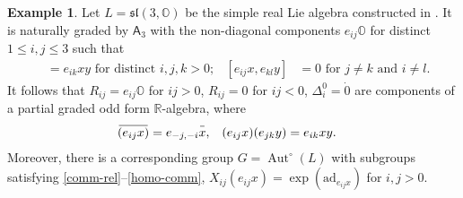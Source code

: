 \documentclass{article}
\theoremstyle{definition}
\newtheorem{example}{Example}
\newcommand{\inv}[1]{
    \!\;\overline{
        \!\!\:#1\vphantom !\!\!\:
    }\;\!
}
\DeclareMathOperator{\Aut}{Aut}
\begin{document}
\begin{example}
    Let \(
        L = \mathfrak{sl}(3, \mathbb O)
    \) be the simple real Lie algebra constructed in \cite[theorem 5.1]{magic-square}. It is naturally graded by \(\mathsf A_3\) with the non-diagonal components \(
        e_{ij} \mathbb O
    \) for distinct \(
        1 \leq i, j \leq 3
    \) such that
    \begin{align*}
        [e_{ij} x, e_{jk} y] &= e_{ik} xy
        \text{ for distinct } i, j, k > 0;
        &
        [e_{ij} x, e_{kl} y] &= 0
        \text{ for } j \neq k \text{ and } i \neq l.
    \end{align*}
    It follows that \(
        R_{ij} = e_{ij} \mathbb O
    \) for \(ij > 0\), \(
        R_{ij} = 0
    \) for \(ij < 0\), \(
        \Delta^0_i = \dot 0
    \) are components of a partial graded odd form \(\mathbb R\)-algebra, where
    \begin{align*}
        \inv{(e_{ij} x)} &= e_{-j, -i} \inv x,
        &
        (e_{ij} x) (e_{jk} y) &= e_{ik} xy.
    \end{align*}
    Moreover, there is a corresponding group \(
        G = \Aut^\circ(L)
    \) with subgroups satisfying \ref{comm-rel}--\ref{homo-comm}, \(
        X_{ij}(e_{ij} x)
        =
        \exp(\mathrm{ad}_{e_{ij} x})
    \) for \(i, j > 0\).
\end{example}
\end{document}
